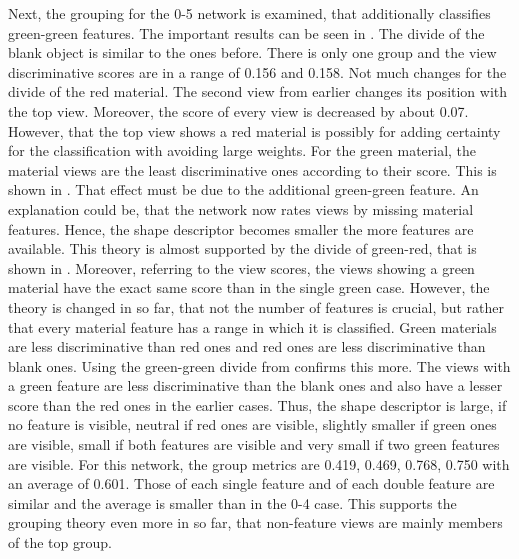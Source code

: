 Next, the grouping for the 0-5 network is examined, that additionally classifies green-green features.
The important results can be seen in .
The divide of the blank object is similar to the ones before.
There is only one group and the view discriminative scores are in a range of 0.156 and 0.158.
Not much changes for the divide of the red material.
The second view from earlier changes its position with the top view.
Moreover, the score of every view is decreased by about 0.07.
However, that the top view shows a red material is possibly for adding certainty for the classification with avoiding large weights.
For the green material, the material views are the least discriminative ones according to their score.
This is shown in .
That effect must be due to the additional green-green feature.
An explanation could be, that the network now rates views by missing material features.
Hence, the shape descriptor becomes smaller the more features are available.
This theory is almost supported by the divide of green-red, that is shown in .
Moreover, referring to the view scores, the views showing a green material have the exact same score than in the single green case.
However, the theory is changed in so far, that not the number of features is crucial, but rather that every material feature has a range in which it is classified.
Green materials are less discriminative than red ones and red ones are less discriminative than blank ones.
Using the green-green divide from  confirms this more.
The views with a green feature are less discriminative than the blank ones and also have a lesser score than the red ones in the earlier cases.
Thus, the shape descriptor is large, if no feature is visible, neutral if red ones are visible, slightly smaller if green ones are visible, small if both features are visible and very small if two green features are visible.
For this network, the group metrics are 0.419, 0.469, 0.768, 0.750 with an average of 0.601.
Those of each single feature and of each double feature are similar and the average is smaller than in the 0-4 case.
This supports the grouping theory even more in so far, that non-feature views are mainly members of the top group.
